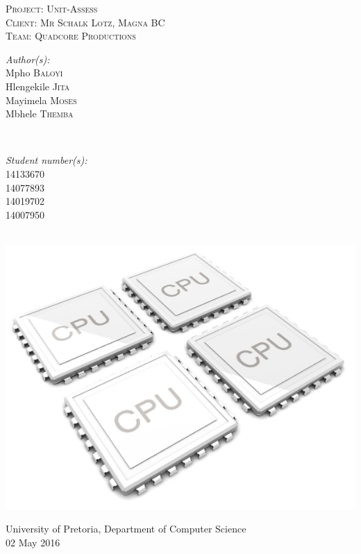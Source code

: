 \documentclass[a4paper,12pt]{article}
\begin{document}
\begin{titlepage}
\center

\textsc{\LARGE Project: Unit-Assess}\\[1.5cm]
\textsc{\Large Client: Mr Schalk Lotz, Magna BC}\\[0.5cm]
\textsc{\large Team: Quadcore Productions}\\[0.5cm]

\begin{minipage}{0.4\textwidth}
\begin{flushleft} \large
\emph{Author(s):}\\
Mpho \textsc{Baloyi}\\
Hlengekile \textsc{Jita}\\
Mayimela \textsc{Moses}\\
Mbhele \textsc{Themba}\\
\end{flushleft}
\end{minipage}
~
\begin{minipage}{0.4\textwidth}
\begin{flushright} \large
\emph{Student number(s):} \\
14133670\\ %
14077893\\
14019702\\
14007950\\
\end{flushright}
\end{minipage}\\

\includegraphics[width=\textwidth]{2012-quad-core-phones}

{\large University of Pretoria, Department of Computer Science}\\

{\large 02 May 2016}\\[3cm]

\vfil

\end{titlepage}
\end{document}
